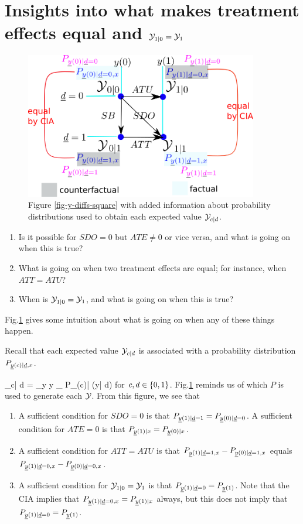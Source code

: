 \section{Insights into
what makes treatment effects equal and
${\cal Y}_{1|0}={\cal Y}_{1}$}
\label{sec-td-ignored}

\begin{figure}[h!]
\centering
\includegraphics[width=4in]
{pot-out/y-diffs-square-probs.png}
\caption{Figure \ref{fig-y-diffs-square}
with added information
about  probability distributions
used to obtain each expected value
 ${\cal Y}_{c| d }$.}
\label{fig-y-diffs-square-probs}
\end{figure}


\begin{enumerate}
\item
Is it
possible for $SDO=0$ but $ATE\neq 0$
or vice versa, and
what is going on when this is true?
\item
What is going on when two treatment effects
are equal; for instance, when $ATT=ATU$?
\item
When is ${\cal Y}_{1|0}={\cal Y}_{1}$,
and what is going on when this is  true?
\end{enumerate}
Fig.\ref{fig-y-diffs-square-probs}
gives some
intuition
about what is
going on when any of these
things happen.

Recall that
each expected value
${\cal Y}_{c|d}$
is associated with a probability
distribution $P_{\rvy(c)|\rvd,x}$.

\beq
\caly_{c| d }
=
\sum_{y} y
_{
P_{\rvy(c)| \rvd}(y| d)}
\eeq
for $c,  d\in \{0,1\}$.
Fig.\ref{fig-y-diffs-square-probs}
reminds us of which $P$
is used to generate each ${\cal Y}$.
From this figure, we see that

\begin{enumerate}
\item
A sufficient
condition for $SDO=0$
is that
$P_{\rvy(1)| \rvd=1}
=
P_{\rvy(0)| \rvd=0}$.
A sufficient
condition for $ATE=0$
is that
$P_{\rvy(1)|x}
=
P_{\rvy(0)|x}$.

\item
A sufficient condition for
$ATT=ATU$
is that
$P_{\rvy(1)| \rvd=1,x}
-
P_{\rvy(0)| \rvd=1,x}$
equals
$P_{\rvy(1)| \rvd=0,x}
-
P_{\rvy(0)| \rvd=0,x}$.
\item
A sufficient condition for ${\cal Y}_{1|0}={\cal Y}_{1}$
is that
$P_{\rvy(1)| \rvd=0}=
P_{\rvy(1)}$. Note that
the CIA implies that
$P_{\rvy(1)| \rvd=0,x}=
P_{\rvy(1)|x}$ always,
but this does not imply that
$P_{\rvy(1)| \rvd=0}=
P_{\rvy(1)}$.
\end{enumerate}


